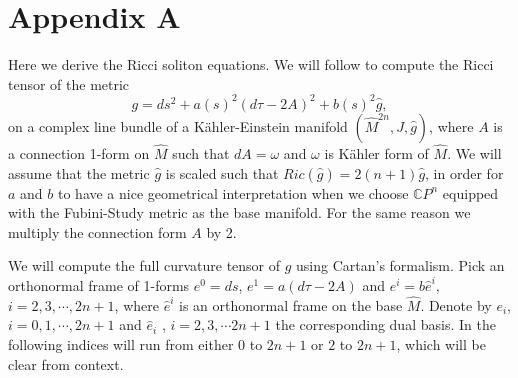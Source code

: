 \documentclass{amsart}
\theoremstyle{definition}
\theoremstyle{remark}
\numberwithin{equation}{section}
\begin{document}
\section*{Appendix A}
Here we derive the Ricci soliton equations. We will follow \cite{PP87} to compute the Ricci tensor of the metric
\begin{equation*}
g = ds^2 + a(s)^2 \left( d\tau - 2 A\right)^2 + b(s)^2 \hat{g},
\end{equation*}
on a complex line bundle of a K\"ahler-Einstein manifold $(\hat{M}^{2n}, J, \hat{g})$, where $A$ is a connection 1-form on $\hat{M}$ such that $dA = \omega$ and $\omega$ is K\"ahler form of $\hat{M}$. We will assume that the metric $\hat{g}$ is scaled such that $Ric(\hat{g}) = 2(n+1) \hat{g}$, in order for $a$ and $b$ to have a nice geometrical interpretation when we choose $\mathbb{C}P^n$ equipped with the Fubini-Study metric as the base manifold. For the same reason we multiply the  connection form $A$ by 2.

We will compute the full curvature tensor of $g$ using Cartan's formalism. Pick an orthonormal frame of 1-forms $e^0 = ds$, $e^1 = a\left(d\tau - 2A\right)$ and $e^i = b \hat{e}^i$, $i = 2, 3, \cdots, 2n+1$, where $\hat{e}^i$ is an orthonormal frame on the base $\hat{M}$. Denote by $e_i$, $i = 0, 1, \cdots, 2n+1$ and $\hat{e}_i$ , $i = 2, 3, \cdots 2n+1$ the corresponding dual basis. In the following indices will run from either $0$ to $2n+1$ or $2$ to $2n+1$, which will be clear from context. 
\end{document}
